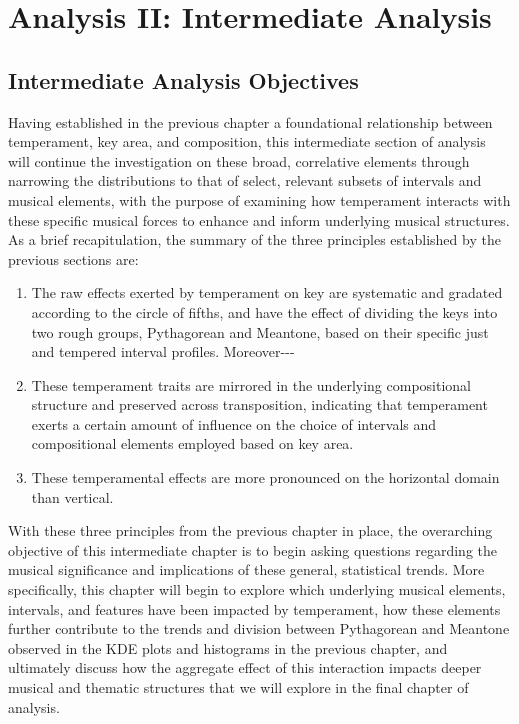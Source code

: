     
    
    

    \hypertarget{Analysis II: Intermediate Analysis}{\chapter{Analysis II: Intermediate Analysis}\label{Analysis II: Intermediate Analysis}}


    \section{Intermediate Analysis
Objectives}\label{intermediate-analysis-objectives}

    Having established in the previous chapter a foundational relationship
between temperament, key area, and composition, this intermediate
section of analysis will continue the investigation on these broad,
correlative elements through narrowing the distributions to that of
select, relevant subsets of intervals and musical elements, with the
purpose of examining how temperament interacts with these specific
musical forces to enhance and inform underlying musical structures. As a
brief recapitulation, the summary of the three principles established by
the previous sections are:

\begin{enumerate}
\def\labelenumi{\arabic{enumi}.}
\tightlist
\item
  The raw effects exerted by temperament on key are systematic and
  gradated according to the circle of fifths, and have the effect of
  dividing the keys into two rough groups, Pythagorean and Meantone,
  based on their specific just and tempered interval profiles.
  Moreover-\/-\/-
\item
  These temperament traits are mirrored in the underlying compositional
  structure and preserved across transposition, indicating that
  temperament exerts a certain amount of influence on the choice of
  intervals and compositional elements employed based on key area.
\item
  These temperamental effects are more pronounced on the horizontal
  domain than vertical.
\end{enumerate}

With these three principles from the previous chapter in place, the
overarching objective of this intermediate chapter is to begin asking
questions regarding the musical significance and implications of these
general, statistical trends. More specifically, this chapter will begin
to explore which underlying musical elements, intervals, and features
have been impacted by temperament, how these elements further contribute
to the trends and division between Pythagorean and Meantone observed in
the KDE plots and histograms in the previous chapter, and ultimately
discuss how the aggregate effect of this interaction impacts deeper
musical and thematic structures that we will explore in the final
chapter of analysis.

